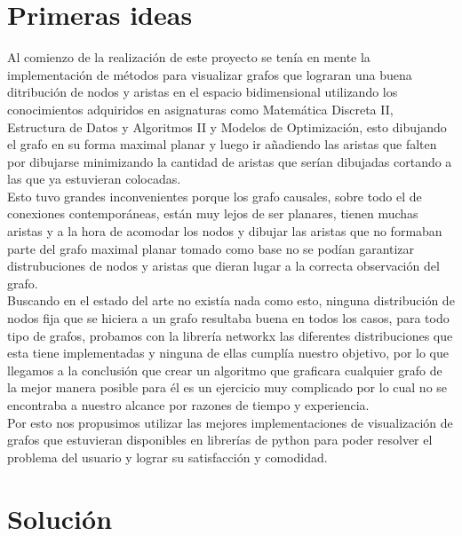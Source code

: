 \documentclass[a4paper,10pt,twocolumn]{article}
\begin{document}
\section*{Primeras ideas}

Al comienzo de la realización de este proyecto se tenía en mente la implementación de métodos para visualizar grafos que lograran una buena ditribución de nodos y aristas en el espacio bidimensional utilizando los conocimientos adquiridos en asignaturas como Matemática Discreta II, Estructura de Datos y Algoritmos II y Modelos de Optimización, esto dibujando el grafo en su forma maximal planar y luego ir añadiendo las aristas que falten por dibujarse  minimizando la cantidad de aristas que serían dibujadas cortando a las que ya estuvieran colocadas. \\

Esto tuvo grandes inconvenientes porque los grafo causales, sobre todo el de conexiones contemporáneas, están muy lejos de ser planares, tienen muchas aristas y a la hora de acomodar los nodos y dibujar las aristas que no formaban parte del grafo maximal planar tomado como base no se podían garantizar distrubuciones de nodos y aristas que dieran lugar a la correcta observación del grafo.\\

Buscando en el estado del arte no existía nada como esto, ninguna distribución de nodos fija que se hiciera a un grafo resultaba buena en todos los casos, para todo tipo de grafos, probamos con la librería networkx las diferentes distribuciones que esta tiene implementadas y ninguna de ellas cumplía nuestro objetivo, por lo que llegamos a la conclusión que crear un algoritmo que graficara cualquier grafo de la mejor manera posible para él es un ejercicio muy complicado por lo cual no se encontraba a nuestro alcance por razones de tiempo y experiencia.\\

Por esto nos propusimos utilizar las mejores implementaciones de visualización de grafos que estuvieran disponibles en librerías de python para poder resolver el problema del usuario y lograr su satisfacción y comodidad.\\



\section*{Solución}
\end{document}
